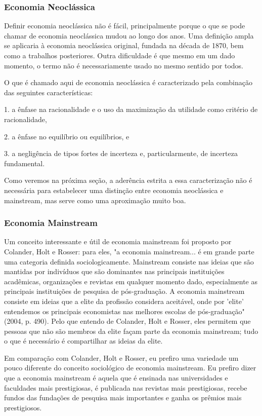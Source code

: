 \documentclass[12pt]{article}
\begin{document}
\subsubsection{\textbf{Economia Neoclássica}}

Definir economia neoclássica não é fácil, principalmente porque o que se pode chamar de economia neoclássica mudou ao longo dos anos. Uma definição ampla se aplicaria à economia neoclássica original, fundada na década de 1870, bem como a trabalhos posteriores. Outra dificuldade é que mesmo em um dado momento, o termo não é necessariamente usado no mesmo sentido por todos.

O que é chamado aqui de economia neoclássica é caracterizado pela combinação das seguintes características:

1. a ênfase na racionalidade e o uso da maximização da utilidade como critério de racionalidade,

2. a ênfase no equilíbrio ou equilíbrios, e

3. a negligência de tipos fortes de incerteza e, particularmente, de incerteza fundamental.

Como veremos na próxima seção, a aderência estrita a essa caracterização não é necessária para estabelecer uma distinção entre economia neoclássica e mainstream, mas serve como uma aproximação muito boa.

\subsubsection{\textbf{Economia Mainstream}}

Um conceito interessante e útil de economia mainstream foi proposto por Colander, Holt e Rosser: para eles, "a economia mainstream... é em grande parte uma categoria definida sociologicamente. Mainstream consiste nas ideias que são mantidas por indivíduos que são dominantes nas principais instituições acadêmicas, organizações e revistas em qualquer momento dado, especialmente as principais instituições de pesquisa de pós-graduação. A economia mainstream consiste em ideias que a elite da profissão considera aceitável, onde por 'elite' entendemos os principais economistas nas melhores escolas de pós-graduação" (2004, p. 490). Pelo que entendo de Colander, Holt e Rosser, eles permitem que pessoas que não são membros da elite façam parte da economia mainstream; tudo o que é necessário é compartilhar as ideias da elite.

Em comparação com Colander, Holt e Rosser, eu prefiro uma variedade um pouco diferente do conceito sociológico de economia mainstream. Eu prefiro dizer que a economia mainstream é aquela que é ensinada nas universidades e faculdades mais prestigiosas, é publicada nas revistas mais prestigiosas, recebe fundos das fundações de pesquisa mais importantes e ganha os prêmios mais prestigiosos.
\end{document}
